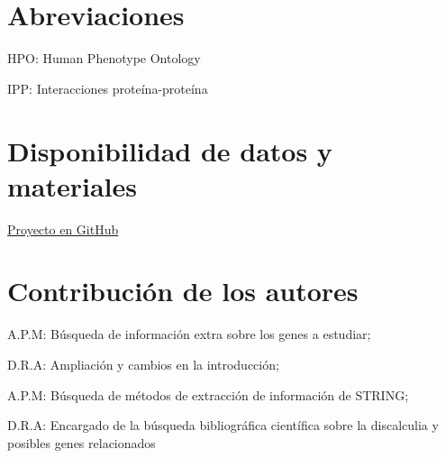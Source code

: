 \documentclass{bmcart}
\begin{document}
	\begin{backmatter}
	
		\section*{Abreviaciones}%
			HPO: Human Phenotype Ontology
			\hfill
			
			IPP: Interacciones proteína-proteína

		
		\section*{Disponibilidad de datos y materiales}%
			\href{https://github.com/Archerd6/Projecto_Biologia_de_Sistemas}{Proyecto en GitHub}
		
		\section*{Contribución de los autores}
		    
		    A.P.M:  Búsqueda de información extra sobre los genes a estudiar;
			\hfill
		    
		    D.R.A: Ampliación y cambios en la introducción;
		    \hfill
			
			A.P.M:  Búsqueda de métodos de extracción de información de STRING;
			\hfill
			
			D.R.A: Encargado de la búsqueda bibliográfica científica sobre la discalculia y posibles genes relacionados
		
		
		
	
	\end{backmatter}
\end{document}
